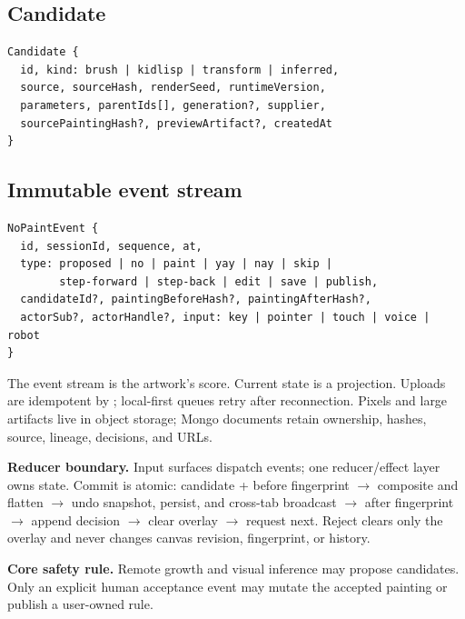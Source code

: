 \documentclass[10pt,letterpaper,twocolumn]{article}
\newcommand{\mono}[1]{\code{#1}}
\begin{document}
\subsection{Candidate}

\begin{lstlisting}[basicstyle=\ttfamily\scriptsize,breaklines=true]
Candidate {
  id, kind: brush | kidlisp | transform | inferred,
  source, sourceHash, renderSeed, runtimeVersion,
  parameters, parentIds[], generation?, supplier,
  sourcePaintingHash?, previewArtifact?, createdAt
}
\end{lstlisting}

\subsection{Immutable event stream}

\begin{lstlisting}[basicstyle=\ttfamily\scriptsize,breaklines=true]
NoPaintEvent {
  id, sessionId, sequence, at,
  type: proposed | no | paint | yay | nay | skip |
        step-forward | step-back | edit | save | publish,
  candidateId?, paintingBeforeHash?, paintingAfterHash?,
  actorSub?, actorHandle?, input: key | pointer | touch | voice | robot
}
\end{lstlisting}

The event stream is the artwork's score. Current state is a projection. Uploads are idempotent by \mono{sessionId + sequence}; local-first queues retry after reconnection. Pixels and large artifacts live in object storage; Mongo documents retain ownership, hashes, source, lineage, decisions, and URLs.

\begin{plain}
\textbf{Reducer boundary.} Input surfaces dispatch events; one reducer/effect layer owns state. Commit is atomic: candidate + before fingerprint $\rightarrow$ composite and flatten $\rightarrow$ undo snapshot, persist, and cross-tab broadcast $\rightarrow$ after fingerprint $\rightarrow$ append decision $\rightarrow$ clear overlay $\rightarrow$ request next. Reject clears only the overlay and never changes canvas revision, fingerprint, or history.
\end{plain}

\begin{hero}
\textbf{Core safety rule.} Remote growth and visual inference may propose candidates. Only an explicit human acceptance event may mutate the accepted painting or publish a user-owned rule.
\end{hero}
\end{document}
